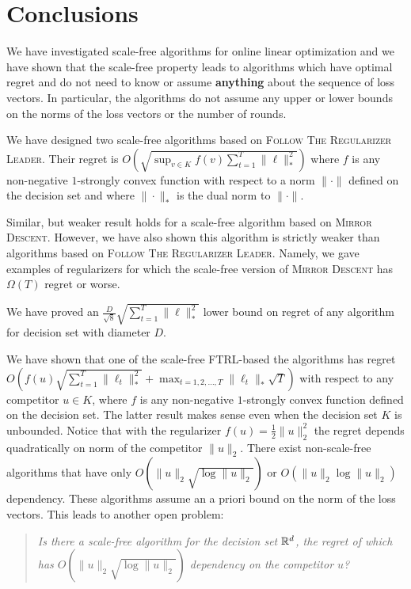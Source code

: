 \section{Conclusions}
\label{section:conclusions}

We have investigated scale-free algorithms for online linear optimization and
we have shown that the scale-free property leads to algorithms which have optimal
regret and do not need to know or assume \textbf{anything} about the sequence
of loss vectors. In particular, the algorithms do not assume any upper or lower
bounds on the norms of the loss vectors or the number of rounds.

We have designed two scale-free algorithms based on \textsc{Follow The
Regularizer Leader}.  Their regret is $O \left(\sqrt{\sup_{v \in K} f(v)
\sum_{t=1}^T \|\ell\|_*^2} \right)$ where $f$ is any non-negative $1$-strongly
convex function with respect to a norm $\|\cdot\|$ defined on the decision set
and where $\|\cdot\|_*$ is the dual norm to $\|\cdot\|$.

Similar, but weaker result holds for a scale-free algorithm based on
\textsc{Mirror Descent}. However, we have also shown this algorithm is strictly
weaker than algorithms based on \textsc{Follow The Regularizer Leader}. Namely,
we gave examples of regularizers for which the scale-free version of
\textsc{Mirror Descent} has $\Omega(T)$ regret or worse.

We have proved an $\frac{D}{\sqrt{8}} \sqrt{\sum_{t=1}^T \|\ell\|_*^2}$
lower bound on regret of any algorithm for decision set with diameter $D$.

We have shown that one of the scale-free \textsc{FTRL}-based the algorithms has
regret $O \left(f(u) \sqrt{\sum_{t=1}^T \|\ell_t\|_*^2} + \max_{t=1,2,\dots,T}
\|\ell_t\|_* \sqrt{T} \right)$ with respect to any competitor $u \in K$, where
$f$ is any non-negative $1$-strongly convex function defined on the decision
set.  The latter result makes sense even when the decision set $K$ is
unbounded. Notice that with the regularizer $f(u) = \frac{1}{2}\|u\|_2^2$ the
regret depends quadratically on norm of the competitor $\|u\|_2$. There
exist non-scale-free algorithms \cite{McMahan-Streeter-2012,
McMahan-Abernethy-2013, Orabona-2013, McMahan-Orabona-2014, Orabona-2014} that
have only $O(\|u\|_2 \sqrt{\log \|u\|_2})$ or $O(\|u\|_2 \log \|u\|_2)$
dependency.  These algorithms assume an a priori bound on the norm of the loss
vectors.  This leads to another open problem:
%
\begin{quotation}
\noindent
\emph{Is there a scale-free algorithm for the decision set $\mathbb{R}^d$, the regret of
which has $O(\|u\|_2 \sqrt{\log \|u\|_2})$ dependency on the competitor $u$?}
\end{quotation}
